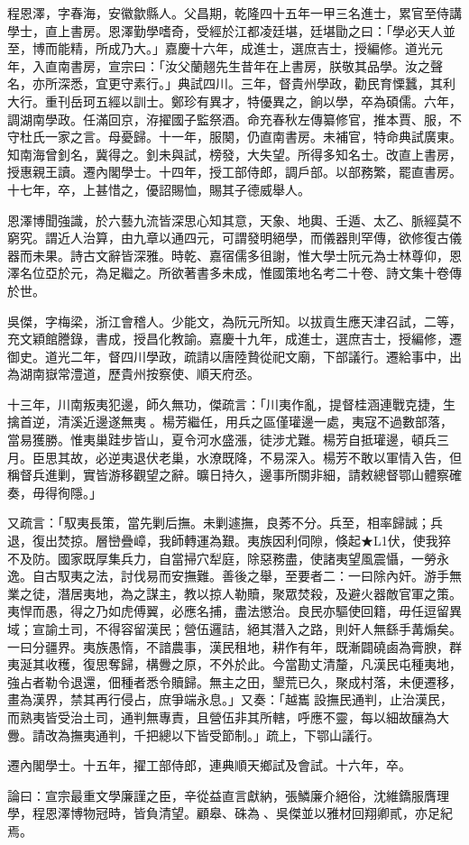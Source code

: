 \begin{pinyinscope}
程恩澤，字春海，安徽歙縣人。父昌期，乾隆四十五年一甲三名進士，累官至侍講學士，直上書房。恩澤勤學嗜奇，受經於江都凌廷堪，廷堪勖之曰：「學必天人並至，博而能精，所成乃大。」嘉慶十六年，成進士，選庶吉士，授編修。道光元年，入直南書房，宣宗曰：「汝父蘭翹先生昔年在上書房，朕敬其品學。汝之聲名，亦所深悉，宜更守素行。」典試四川。三年，督貴州學政，勸民育慄蠶，其利大行。重刊岳珂五經以訓士。鄭珍有異才，特優異之，餉以學，卒為碩儒。六年，調湖南學政。任滿回京，洊擢國子監祭酒。命充春秋左傳纂修官，推本賈、服，不守杜氏一家之言。母憂歸。十一年，服闋，仍直南書房。未補官，特命典試廣東。知南海曾釗名，冀得之。釗未與試，榜發，大失望。所得多知名士。改直上書房，授惠親王讀。遷內閣學士。十四年，授工部侍郎，調戶部。以部務繁，罷直書房。十七年，卒，上甚惜之，優詔賜恤，賜其子德威舉人。

恩澤博聞強識，於六藝九流皆深思心知其意，天象、地輿、壬遁、太乙、脈經莫不窮究。謂近人治算，由九章以通四元，可謂發明絕學，而儀器則罕傳，欲修復古儀器而未果。詩古文辭皆深雅。時乾、嘉宿儒多徂謝，惟大學士阮元為士林尊仰，恩澤名位亞於元，為足繼之。所欲著書多未成，惟國策地名考二十卷、詩文集十卷傳於世。

吳傑，字梅梁，浙江會稽人。少能文，為阮元所知。以拔貢生應天津召試，二等，充文穎館謄錄，書成，授昌化教諭。嘉慶十九年，成進士，選庶吉士，授編修，遷御史。道光二年，督四川學政，疏請以唐陸贄從祀文廟，下部議行。遷給事中，出為湖南嶽常澧道，歷貴州按察使、順天府丞。

十三年，川南叛夷犯邊，師久無功，傑疏言：「川夷作亂，提督桂涵連戰克捷，生擒首逆，清溪近邊遂無夷。楊芳繼任，用兵之區僅瓘邊一處，夷寇不過數部落，當易獲勝。惟夷巢跬步皆山，夏令河水盛漲，徒涉尤難。楊芳自抵瓘邊，頓兵三月。臣思其故，必逆夷退伏老巢，水潦既降，不易深入。楊芳不敢以軍情入告，但稱督兵進剿，實皆游移觀望之辭。曠日持久，邊事所關非細，請敕總督鄂山體察確奏，毋得徇隱。」

又疏言：「馭夷長策，當先剿后撫。未剿遽撫，良莠不分。兵至，相率歸誠；兵退，復出焚掠。層巒疊嶂，我師轉運為艱。夷族因利伺隙，倏起★L1伏，使我猝不及防。國家既厚集兵力，自當掃穴犁庭，除惡務盡，使諸夷望風震懾，一勞永逸。自古馭夷之法，討伐易而安撫難。善後之舉，至要者二：一曰除內奸。游手無業之徒，潛居夷地，為之謀主，教以掠人勒贖，聚眾焚殺，及避火器敵官軍之策。夷悍而愚，得之乃如虎傅翼，必應名捕，盡法懲治。良民亦驅使回籍，毋任逗留異域；宣諭土司，不得容留漢民；營伍邏詰，絕其潛入之路，則奸人無繇手冓煽矣。一曰分疆界。夷族愚惰，不諳農事，漢民租地，耕作有年，既漸闢磽鹵為膏腴，群夷涎其收穫，復思奪歸，構釁之原，不外於此。今當勘丈清釐，凡漢民屯種夷地，強占者勒令退還，佃種者悉令贖歸。無主之田，墾荒已久，聚成村落，未便遷移，畫為漢界，禁其再行侵占，庶爭端永息。」又奏：「越巂設撫民通判，止治漢民，而熟夷皆受治土司，通判無專責，且營伍非其所轄，呼應不靈，每以細故釀為大釁。請改為撫夷通判，千把總以下皆受節制。」疏上，下鄂山議行。

遷內閣學士。十五年，擢工部侍郎，連典順天鄉試及會試。十六年，卒。

論曰：宣宗最重文學廉謹之臣，辛從益直言獻納，張鱗廉介絕俗，沈維鐈服膺理學，程恩澤博物冠時，皆負清望。顧皋、硃為、吳傑並以雅材回翔卿貳，亦足紀焉。


\end{pinyinscope}